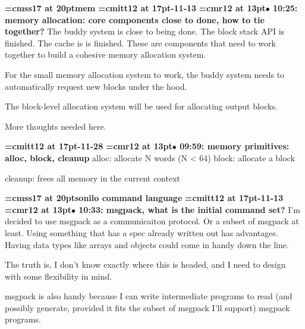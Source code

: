 {\medskip\noindent\bf\font\titlefont=cmss17 at 20pt\titlefont mem}\medskip
{\medskip\noindent\bf\font\titlefont=cmitt12 at 17pt-11-13}\medskip
{\smallskip\noindent\bf\font\titlefont=cmr12 at 13pt\titlefont $\bullet$ 10:25: memory allocation: core components close to done, how to tie together?}\smallskip
The buddy system is close to being done. The block stack API is finished. The cache is is finished. These are components that need to work together to build a cohesive memory allocation system.
\par

For the small memory allocation system to work, the buddy system needs to automatically request new blocks under the hood.
\par

The block-level allocation system will be used for allocating output blocks.
\par

More thoughts needed here.
\par

{\medskip\noindent\bf\font\titlefont=cmitt12 at 17pt-11-28}\medskip
{\smallskip\noindent\bf\font\titlefont=cmr12 at 13pt\titlefont $\bullet$ 09:59: memory primitives: alloc, block, cleanup}\smallskip
alloc: allocate N words (N < 64) block: allocate a block
\par

cleanup: frees all memory in the current context
\par

{\medskip\noindent\bf\font\titlefont=cmss17 at 20pt\titlefont sonilo command language}\medskip
{\medskip\noindent\bf\font\titlefont=cmitt12 at 17pt-11-13}\medskip
{\smallskip\noindent\bf\font\titlefont=cmr12 at 13pt\titlefont $\bullet$ 10:33: msgpack, what is the initial command set?}\smallskip
I'm decided to use msgpack as a communicaiton protocol. Or a subset of msgpack at least. Using something that has a spec already written out has advantages. Having data types like arrays and objects could come in handy down the line.
\par

The truth is, I don't know exactly where this is headed, and I need to design with some flexibility in mind.
\par

msgpack is also handy because I can write intermediate programs to read (and possibly generate, provided it fits the subset of msgpack I'll support) msgpack programs.
\par

